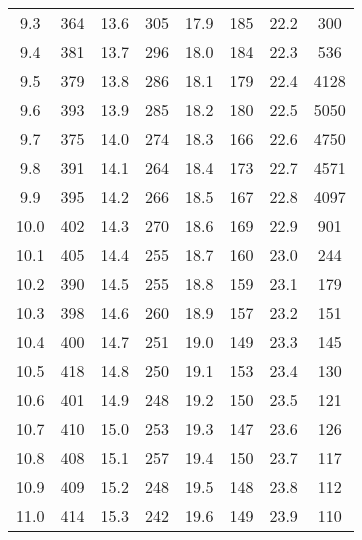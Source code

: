 \begin{table}[H]
\begin{tabular}{S[table-format=2.1] c | S[table-format=2.1] c | S[table-format=2.1] c | S[table-format=2.1] c}
\num{9.3}  & \num{364}  &   \num{13.6} & \num{305}  &   \num{17.9} & \num{185}  &   \num{22.2} & \num{300}  \\
\num{9.4}  & \num{381}  &   \num{13.7} & \num{296}  &   \num{18.0} & \num{184}  &   \num{22.3} & \num{536}  \\
\num{9.5}  & \num{379}  &   \num{13.8} & \num{286}  &   \num{18.1} & \num{179}  &   \num{22.4} & \num{4128} \\
\num{9.6}  & \num{393}  &   \num{13.9} & \num{285}  &   \num{18.2} & \num{180}  &   \num{22.5} & \num{5050} \\
\num{9.7}  & \num{375}  &   \num{14.0} & \num{274}  &   \num{18.3} & \num{166}  &   \num{22.6} & \num{4750} \\
\num{9.8}  & \num{391}  &   \num{14.1} & \num{264}  &   \num{18.4} & \num{173}  &   \num{22.7} & \num{4571} \\
\num{9.9}  & \num{395}  &   \num{14.2} & \num{266}  &   \num{18.5} & \num{167}  &   \num{22.8} & \num{4097} \\
\num{10.0} & \num{402}  &   \num{14.3} & \num{270}  &   \num{18.6} & \num{169}  &   \num{22.9} & \num{901}  \\
\num{10.1} & \num{405}  &   \num{14.4} & \num{255}  &   \num{18.7} & \num{160}  &   \num{23.0} & \num{244}  \\
\num{10.2} & \num{390}  &   \num{14.5} & \num{255}  &   \num{18.8} & \num{159}  &   \num{23.1} & \num{179}  \\
\num{10.3} & \num{398}  &   \num{14.6} & \num{260}  &   \num{18.9} & \num{157}  &   \num{23.2} & \num{151}  \\
\num{10.4} & \num{400}  &   \num{14.7} & \num{251}  &   \num{19.0} & \num{149}  &   \num{23.3} & \num{145}  \\
\num{10.5} & \num{418}  &   \num{14.8} & \num{250}  &   \num{19.1} & \num{153}  &   \num{23.4} & \num{130}  \\
\num{10.6} & \num{401}  &   \num{14.9} & \num{248}  &   \num{19.2} & \num{150}  &   \num{23.5} & \num{121}  \\
\num{10.7} & \num{410}  &   \num{15.0} & \num{253}  &   \num{19.3} & \num{147}  &   \num{23.6} & \num{126}  \\
\num{10.8} & \num{408}  &   \num{15.1} & \num{257}  &   \num{19.4} & \num{150}  &   \num{23.7} & \num{117}  \\
\num{10.9} & \num{409}  &   \num{15.2} & \num{248}  &   \num{19.5} & \num{148}  &   \num{23.8} & \num{112}  \\
\num{11.0} & \num{414}  &   \num{15.3} & \num{242}  &   \num{19.6} & \num{149}  &   \num{23.9} & \num{110}  \\

\end{tabular}
\end{table}
